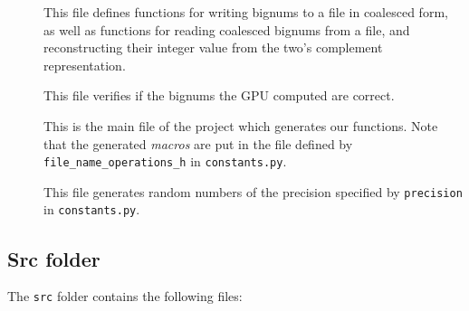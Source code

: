 \documentclass[12pt, a4paper]{report}
\begin{document}
\begin{description}
\item[]
This file defines functions for writing bignums to a file in coalesced form, as
well as functions for reading coalesced bignums from a file, and reconstructing
their integer value from the two's complement representation.

\item[]
This file verifies if the bignums the GPU computed are correct.

\item[]
This is the main file of the project which generates our functions.
Note that the generated \emph{macros} are put in the file defined by
\verb+file_name_operations_h+ in \verb+constants.py+.

\item[]
This file generates random numbers of the precision specified by
\verb+precision+ in \verb+constants.py+.
\end{description}

\subsection{Src folder}
The \verb+src+ folder contains the following files:
\end{document}
